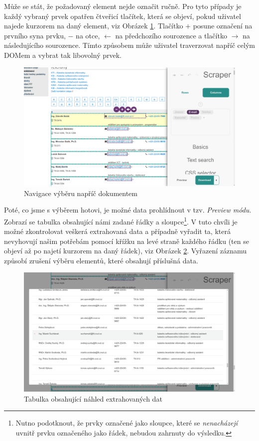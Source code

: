 \documentclass[thesis=B,czech]{FITthesis}[2012/06/26]
\begin{document}
\newpage
Může se stát, že požadovaný element nejde označit ručně. Pro tyto případy je každý vybraný prvek opatřen čtveřicí tlačítek, která se objeví, pokud uživatel najede kurzorem na daný element, viz Obrázek \ref{fig:scraper_dom_navigation}. Tlačítko \textsf{$+$} posune označení na prvního syna prvku, \textsf{$-$} na otce, \textsf{$\leftarrow$} na předchozího sourozence a tlačítko \textsf{$\rightarrow$} na následujícího sourozence. Tímto způsobem může uživatel traverzovat napříč celým DOMem a vybrat tak libovolný prvek.
\begin{figure}[h]
	\includegraphics[width=\linewidth]{images/Scraper_dom_navigation.png}
	\caption{Navigace výběru napříč dokumentem}
	\label{fig:scraper_dom_navigation}
\end{figure}

Poté, co jsme s výběrem hotovi, je možné data prohlídnout v tzv. \textit{Preview módu}. Zobrazí se tabulka obsahující námi zadané řádky a sloupce\footnote{Nutno podotknout, že prvky označené jako sloupce, které se \emph{nenacházejí} uvnitř prvku označeného jako řádek, nebudou zahrnuty do výsledku.}. V tuto chvíli je možné zkontrolovat veškerá extrahovaná data a případně vyřadit ta, která nevyhovují našim potřebám pomocí křížku na levé straně každého řádku (ten se objeví až po najetí kurzorem na daný řádek), viz Obrázek \ref{fig:scraper_preview_mode}. Vyřazení záznamu způsobí zrušení výběru elementů, které obsahují příslušná data.
\begin{figure}[h]
	\includegraphics[width=\linewidth]{images/Scraper_preview_mode.png}
	\caption{Tabulka obsahující náhled extrahovaných dat}
	\label{fig:scraper_preview_mode}
\end{figure}
\end{document}
